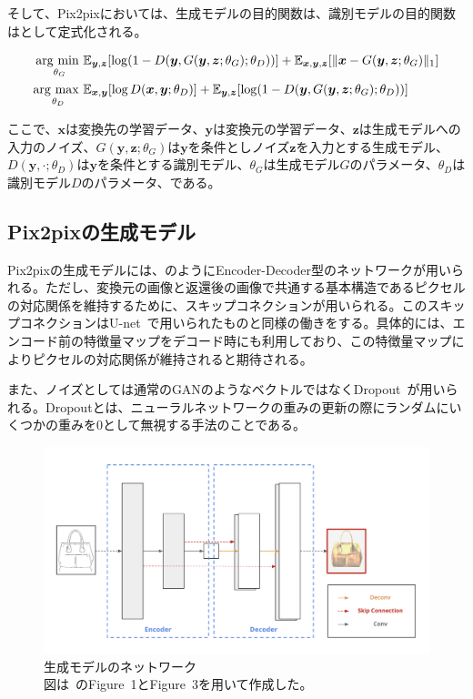 そして、Pix2pixにおいては、生成モデルの目的関数は、識別モデルの目的関数はとして定式化される。

\begin{align}
    \label{eq:pix2pix_G}
    \mathop{\mathrm{arg~min~}}\limits _{\theta_G}& \mathbb{E}_{\boldsymbol{y}, \boldsymbol{z}}[\log (1-D(\boldsymbol{y}, G(\boldsymbol{y}, \boldsymbol{z}; \theta_G); \theta_D))]+\mathbb{E}_{\boldsymbol{x}, \boldsymbol{y}, \boldsymbol{z}}[\|\boldsymbol{x}-G(\boldsymbol{y}, \boldsymbol{z}; \theta_G)\|_{1}]\\
    \label{eq:pix2pix_D}
    \mathop{\mathrm{arg~max~}}\limits _{\theta_D}& \mathbb{E}_{\boldsymbol{x}, \boldsymbol{y}}[\log D(\boldsymbol{x}, \boldsymbol{y}; \theta_D)]+\mathbb{E}_{\boldsymbol{y}, \boldsymbol{z}}[\log (1-D(\boldsymbol{y}, G(\boldsymbol{y}, \boldsymbol{z}; \theta_G); \theta_D))]
\end{align}

ここで、$\boldsymbol{x}$は変換先の学習データ、$\boldsymbol{y}$は変換元の学習データ、$\boldsymbol{z}$は生成モデルへの入力のノイズ、$G(\boldsymbol{y},\boldsymbol{z};\theta_G)$は$\boldsymbol{y}$を条件としノイズ$\boldsymbol{z}$を入力とする生成モデル、$D(\boldsymbol{y},\cdot;\theta_D)$は$\boldsymbol{y}$を条件とする識別モデル、$\theta_G$は生成モデル$G$のパラメータ、$\theta_D$は識別モデル$D$のパラメータ、である。

\subsection{Pix2pixの生成モデル}

Pix2pixの生成モデルには、のようにEncoder-Decoder型のネットワークが用いられる。ただし、変換元の画像と返還後の画像で共通する基本構造であるピクセルの対応関係を維持するために、スキップコネクションが用いられる。このスキップコネクションはU-net~\cite{u-net}で用いられたものと同様の働きをする。具体的には、エンコード前の特徴量マップをデコード時にも利用しており、この特徴量マップによりピクセルの対応関係が維持されると期待される。

また、ノイズとしては通常のGANのようなベクトルではなくDropout~\cite{Dropout}が用いられる。Dropoutとは、ニューラルネットワークの重みの更新の際にランダムにいくつかの重みを0として無視する手法のことである。

\clearpage

\begin{figure}[t]
\centering
\includegraphics[width=0.8\hsize]{figure/u-net.png}
\caption[生成モデルのネットワーク]{生成モデルのネットワーク\\
図は~\cite{pix2pix}のFigure~1とFigure~3を用いて作成した。}
\label{fig:u-net}
\end{figure}

